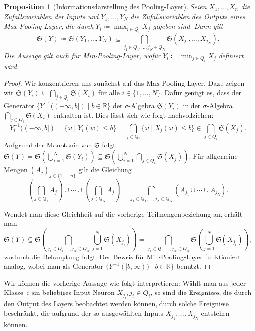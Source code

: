 \documentclass[paper=a4, 	%
		fontsize=11pt,
		abstract=true, 	%
		headsepline, 	%
		notitlepage	%
		]{scrartcl}
\newtheorem{proposition}[theorem]{Proposition}
\theoremstyle{definition}
\newcommand{\R}{\mathbb{R}}
\newcommand{\sig}[1]{\mathfrak{S}{\left( #1 \right)}}
\begin{document}
\begin{proposition}[Informationsdarstellung des Pooling-Layer]
    Seien $X_1,\dots,X_n$ die Zufallsvariablen der Inputs und $Y_1,\dots,Y_N$ die Zufallsvariablen des Outputs eines Max-Pooling-Layer, die durch $Y_i\coloneqq \max_{j \in Q_i} X_j$ gegeben sind.
    Dann gilt
    \[
      \sig{Y} \coloneqq \sig{Y_1,\dots,Y_N}\subseteq \bigcap_{j_1\in Q_1,\dots, j_N\in Q_N} \sig{X_{j_1}, \dots, X_{j_N}}  .
    \]
    Die Aussage gilt auch für Min-Pooling-Layer, wofür $Y_i \coloneqq \min_{j\in Q_i} X_j$ definiert wird.
\end{proposition}
\begin{proof}
    Wir konzentrieren uns zunächst auf das Max-Pooling-Layer.
    Dazu zeigen wir $\sig{Y_i} \subseteq \bigcap_{j\in Q_i} \sig{X_i}$ für alle $i\in\{1,\dots,N\}$.
    Dafür genügt es, dass der Generator $\{ Y^{-1}((-\infty, b]) \mid b\in\R \}$ der $\sigma$-Algebra $\sig{Y_i}$ in der $\sigma$-Algebra $\bigcap_{j\in Q_i}\sig{X_i}$ enthalten ist.
    Dies lässt sich wie folgt nachvollziehen:
    \[
        Y_i^{-1}((-\infty, b])
        = \{ \omega \mid Y_i(w) \leq b \}
        = \bigcap_{j\in Q_i} \{\omega\mid X_j(\omega) \leq b\}
        \in \bigcap_{j\in Q_i} \sig{X_j}.
    \]
    Aufgrund der Monotonie von $\mathfrak{S}$ folgt $\sig{Y} = \sig{\bigcup_{i=1}^N \sig{Y_i} }\subseteq \sig{ \bigcup_{i=1}^N \bigcap_{j\in Q_i} \sig{X_j} }$.
    Für allgemeine Mengen $(A_j)_{j\in\{1,\dots,n\}}$ gilt die Gleichung
    \[
        \left(\bigcap_{j\in Q_1} A_j\right) 
        \cup \cdots \cup 
        \left(\bigcap_{j\in Q_N} A_j\right) 
        = \bigcap_{j_1\in Q_1, \dots, j_N\in Q_N} 
        \left( 
            A_{j_1} \cup \cdots \cup A_{j_N}
        \right).
    \]

    Wendet man diese Gleichheit auf die vorherige Teilmengenbeziehung an, erhält man
    \[
        \sig{Y} \subseteq 
        \sig{
        \bigcap_{j_1\in Q_1, \dots, j_N\in Q_N} 
        \bigcup_{j=1}^N \sig{X_{j_i}}
        }
        =
        \bigcap_{j_1\in Q_1, \dots, j_N\in Q_N} 
        \sig{
        \bigcup_{j=1}^N \sig{X_{j_i}}
        },
    \]
    wodurch die Behauptung folgt.
    Der Beweis für Min-Pooling-Layer funktioniert analog, wobei man als Generator $\{ Y^{-1}([b,\infty)) \mid b\in\R\}$ benutzt.
\end{proof}

Wir können die vorherige Aussage wie folgt interpretieren:
Wählt man aus jeder Klasse~$i$ ein beliebiges Input Neuron $X_{j_i}, j_i \in Q_i$, so sind die Ereignisse, die durch den Output des Layers beobachtet werden können, durch solche Ereignisse beschränkt, die aufgrund der so ausgewählten Inputs $X_{j_1},\dots, X_{j_N}$ entstehen können.
\end{document}

